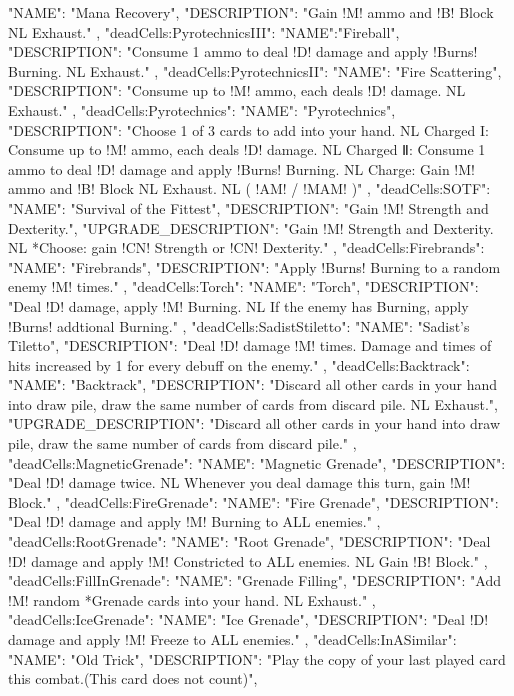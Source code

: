 {{    "NAME": "Mana Recovery",
    "DESCRIPTION": "Gain !M! ammo and !B! Block NL Exhaust."
  },
  "deadCells:PyrotechnicsIII": {
    "NAME":"Fireball",
    "DESCRIPTION": "Consume 1 ammo to deal !D! damage and apply !Burns! Burning. NL Exhaust."
  },
  "deadCells:PyrotechnicsII": {
    "NAME": "Fire Scattering",
    "DESCRIPTION": "Consume up to !M! ammo, each deals !D! damage. NL Exhaust."
  },
  "deadCells:Pyrotechnics": {
    "NAME": "Pyrotechnics",
    "DESCRIPTION": "Choose 1 of 3 cards to add into your hand. NL Charged I: Consume up to !M! ammo, each deals !D! damage. NL Charged Ⅱ: Consume 1 ammo to deal !D! damage and apply !Burns! Burning. NL Charge: Gain !M! ammo and !B! Block NL Exhaust. NL ( !AM! / !MAM! 
)"
  },
  "deadCells:SOTF": {
    "NAME": "Survival of the Fittest",
    "DESCRIPTION": "Gain !M! Strength and Dexterity.",
    "UPGRADE_DESCRIPTION": "Gain !M! Strength and Dexterity. NL *Choose: gain !CN! Strength or !CN! Dexterity."
  },
  "deadCells:Firebrands": {
    "NAME": "Firebrands",
    "DESCRIPTION": "Apply !Burns! Burning to a random enemy !M! times."
  },
  "deadCells:Torch": {
    "NAME": "Torch",
    "DESCRIPTION": "Deal !D! damage, apply !M! Burning. NL If the enemy has Burning, apply !Burns! addtional Burning."
  },
  "deadCells:SadistStiletto": {
    "NAME": "Sadist's Tiletto",
    "DESCRIPTION": "Deal !D! damage !M! times. Damage and times of hits increased by 1 for every debuff on the enemy."
  },
  "deadCells:Backtrack": {
    "NAME": "Backtrack",
    "DESCRIPTION": "Discard all other cards in your hand into draw pile, draw the same number of cards from discard pile. NL Exhaust.",
    "UPGRADE_DESCRIPTION": "Discard all other cards in your hand into draw pile, draw the same number of cards from discard pile."
  },
  "deadCells:MagneticGrenade": {
    "NAME": "Magnetic Grenade",
    "DESCRIPTION": "Deal !D! damage twice. NL Whenever you deal damage this turn, gain !M! Block."
  },
  "deadCells:FireGrenade": {
    "NAME": "Fire Grenade",
    "DESCRIPTION": "Deal !D! damage and apply !M! Burning to ALL enemies."
  },
  "deadCells:RootGrenade": {
    "NAME": "Root Grenade",
    "DESCRIPTION": "Deal !D! damage and apply !M! Constricted to ALL enemies. NL Gain !B! Block."
  },
  "deadCells:FillInGrenade": {
    "NAME": "Grenade Filling",
    "DESCRIPTION": "Add !M! random *Grenade cards into your hand. NL Exhaust."
  },
  "deadCells:IceGrenade": {
    "NAME": "Ice Grenade",
    "DESCRIPTION": "Deal !D! damage and apply !M! Freeze to ALL enemies."
  },
  "deadCells:InASimilar": {
    "NAME": "Old Trick",
    "DESCRIPTION": "Play the copy of your last played card this combat.(This card does not count)",
}}
